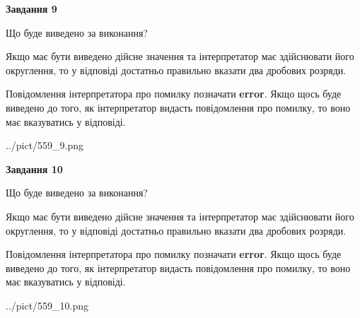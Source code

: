 \documentclass[12pt, ukrainian]{article}
\begin{document}
{\begin {Large}
{\begin {center}\textbf{Завдання 9}\end {center}}\par
Що буде виведено за виконання? \par

Якщо має бути виведено дійсне значення та інтерпретатор має здійснювати його округлення, 
то у відповіді достатньо правильно вказати два дробових розряди.

Повідомлення інтерпретатора про помилку позначати \textbf{error}.
Якщо щось буде виведено до того, як інтерпретатор видасть повідомлення про помилку, 
то воно має вказуватись у відповіді. \par

\begin{center}
	{../pict/559_9.png}
\end{center}
\newpage

{\begin {center}\textbf{Завдання 10}\end {center}}\par
Що буде виведено за виконання? \par

Якщо має бути виведено дійсне значення та інтерпретатор має здійснювати його округлення, 
то у відповіді достатньо правильно вказати два дробових розряди.

Повідомлення інтерпретатора про помилку позначати \textbf{error}.
Якщо щось буде виведено до того, як інтерпретатор видасть повідомлення про помилку, 
то воно має вказуватись у відповіді. \par

\begin{center}
	{../pict/559_10.png}
\end{center}
\newpage

\end {Large}}
\end{document}
